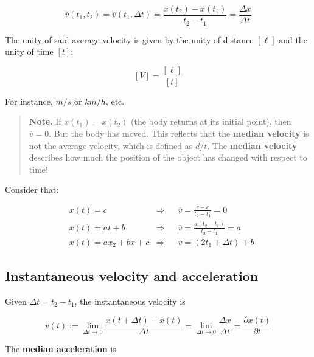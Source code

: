 \documentclass[a4paper, 12pt]{article}
\begin{document}
\begin{equation*}
    \overline{v}(t_1, t_2) = \overline{v}(t_1, \Delta t) = \frac{x(t_2) - x(t_1)}{t_2 - t_1} = \frac{\Delta x}{\Delta t}
\end{equation*}

The unity of said average velocity is given by the unity of distance $[\ell]$ and the unity 
of time $[t]$:

\begin{equation*}
    \left[ V \right]  = \frac{\left[ \ell \right] }{\left[ t \right] }
\end{equation*}

For instance, $m / s$ or $km / h$, etc.


\small
\begin{quote}

\textbf{Note.} If $x(t_1) = x(t_2)$ (the body returns at its initial point), then $\overline{v} = 0$.
But the body has moved. This reflects that the \textbf{median velocity} is not the 
average velocity, which is defined as $d / t$. The \textbf{median velocity} describes 
how much the position of the object has changed with respect to time!

\end{quote}
\normalsize

Consider that: 

\begin{align*}
    &x(t) = c &\Rightarrow &&\overline{v} = \frac{c - c}{t_2 - t_1} = 0 \\ 
    &x(t) = at + b &\Rightarrow &&\overline{v} = \frac{a(t_2 - t_1)}{t_2 - t_1} = a \\ 
    &x(t) = ax_2 + bx + c &\Rightarrow &&\overline{v} = (2t_1 + \Delta t) + b
\end{align*}

\subsection{Instantaneous velocity and acceleration}

Given $\Delta t = t_2 - t_1$, the instantaneous velocity is

\begin{equation*}
    v(t) := \lim_{ \Delta t \to 0 } \frac{x(t+ \Delta t) - x(t) }{\Delta t} = \lim_{\Delta t \to  0} \frac{\Delta x}{\Delta t} = \frac{\partial x(t)}{\partial t}
\end{equation*}

The \textbf{median acceleration} is
\end{document}
